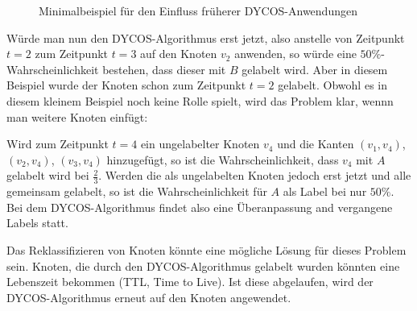 \begin{figure}[ht]
    \centering
    \subfloat[$t=1$]{
        
        \label{fig:graph-t1}
    }%
    \subfloat[$t=2$]{
        
        \label{fig:graph-t2}
    }

    \subfloat[$t=3$]{
        
        \label{fig:graph-t3}
    }%
    \subfloat[$t=4$]{
        
        \label{fig:graph-t4}
    }%
    \label{Formen}
    \caption{Minimalbeispiel für den Einfluss früherer DYCOS-Anwendungen}
\end{figure}

Würde man nun den DYCOS-Algorithmus erst jetzt, also anstelle von
Zeitpunkt $t=2$ zum Zeitpunkt $t=3$ auf den Knoten $v_2$ anwenden, so
würde eine $50\%$-Wahrscheinlichkeit bestehen, dass dieser mit $B$ 
gelabelt wird. Aber in diesem Beispiel wurde der Knoten schon
zum Zeitpunkt $t=2$ gelabelt. Obwohl es in diesem kleinem Beispiel
noch keine Rolle spielt, wird das Problem klar, wennn man weitere
Knoten einfügt:

Wird zum Zeitpunkt $t=4$ ein ungelabelter Knoten $v_4$ und die Kanten
$(v_1, v_4)$, $(v_2, v_4)$, $(v_3, v_4)$ hinzugefügt, so ist die 
Wahrscheinlichkeit, dass $v_4$ mit $A$ gelabelt wird bei $\frac{2}{3}$.
Werden die als ungelabelten Knoten jedoch erst jetzt und alle gemeinsam
gelabelt, so ist die Wahrscheinlichkeit für $A$ als Label bei nur $50\%$.
Bei dem DYCOS-Algorithmus findet also eine Überanpassung and vergangene
Labels statt.

Das Reklassifizieren von Knoten könnte eine mögliche Lösung für dieses
Problem sein. Knoten, die durch den DYCOS-Algorithmus gelabelt wurden
könnten eine Lebenszeit bekommen (TTL, Time to Live). Ist diese 
abgelaufen, wird der DYCOS-Algorithmus erneut auf den Knoten angewendet.

